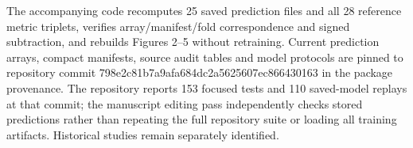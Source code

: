 The accompanying code recomputes 25 saved prediction files and all 28 reference metric triplets, verifies array/manifest/fold correspondence and signed subtraction, and rebuilds Figures 2--5 without retraining. Current prediction arrays, compact manifests, source audit tables and model protocols are pinned to repository commit 798e2c81b7a9afa684dc2a5625607ec866430163 in the package provenance. The repository reports 153 focused tests and 110 saved-model replays at that commit; the manuscript editing pass independently checks stored predictions rather than repeating the full repository suite or loading all training artifacts. Historical studies remain separately identified.
